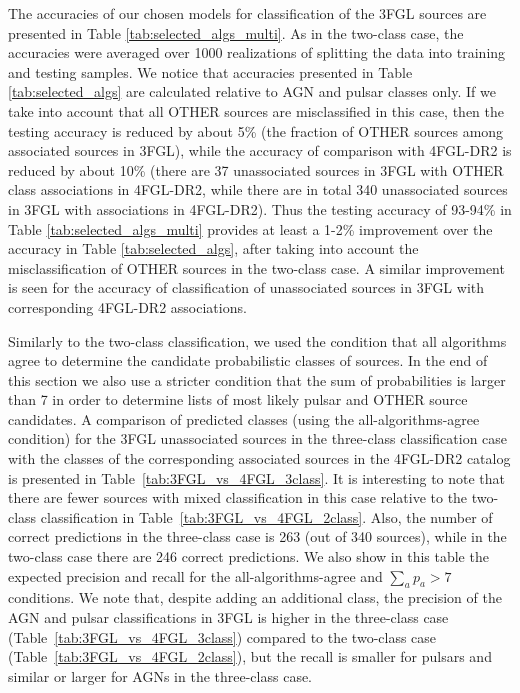 \documentclass[referee]{aa} %
\begin{document}
The accuracies of our chosen models for classification of the 3FGL sources are presented in Table \ref{tab:selected_algs_multi}.
As in the two-class case, the accuracies were averaged over 1000 realizations of splitting the data into training and testing samples.
We notice that accuracies presented in Table \ref{tab:selected_algs} are calculated relative to AGN and pulsar classes only. If we take into account that all OTHER sources
are misclassified in this case, then the testing accuracy is reduced by about 5\% (the fraction of OTHER sources among associated sources in 3FGL),
while the accuracy of comparison with 4FGL-DR2 is reduced by about 10\% (there are 37 unassociated sources in 3FGL with OTHER class associations in 4FGL-DR2,
while there are in total 340 unassociated sources in 3FGL with associations in 4FGL-DR2).
Thus the testing accuracy of 93-94\% in Table \ref{tab:selected_algs_multi} provides at least a 1-2\% improvement over the accuracy in Table \ref{tab:selected_algs},
after taking into account the misclassification of OTHER sources in the two-class case.
A similar improvement is seen for the accuracy of classification of unassociated sources in 3FGL with corresponding 4FGL-DR2 associations.

Similarly to the two-class classification, we used the condition that all algorithms agree to determine the candidate probabilistic classes of sources.
In the end of this section we also use a stricter condition that the sum of probabilities is larger than 7 in order to determine lists of most likely pulsar and OTHER source candidates.
A comparison of predicted classes (using the all-algorithms-agree condition) for the 3FGL unassociated sources in the three-class classification case with the classes of the corresponding associated sources in the 4FGL-DR2 catalog is presented in Table~\ref{tab:3FGL_vs_4FGL_3class}.
It is interesting to note that there are fewer sources with mixed classification in this case relative to the two-class classification in 
Table~\ref{tab:3FGL_vs_4FGL_2class}.
Also, the number of correct predictions in the three-class case is 263 (out of 340 sources), while in the two-class case there are 246 correct predictions.
We also show in this table the expected precision and recall for the all-algorithms-agree and $\sum_a p_a > 7$
conditions.
We note that, despite adding an additional class, the precision of the AGN and pulsar classifications in 3FGL
is higher in the three-class case (Table~\ref{tab:3FGL_vs_4FGL_3class}) compared to the two-class case
(Table~\ref{tab:3FGL_vs_4FGL_2class}), but the recall is smaller for pulsars and similar or larger for AGNs in the three-class case.
\end{document}
